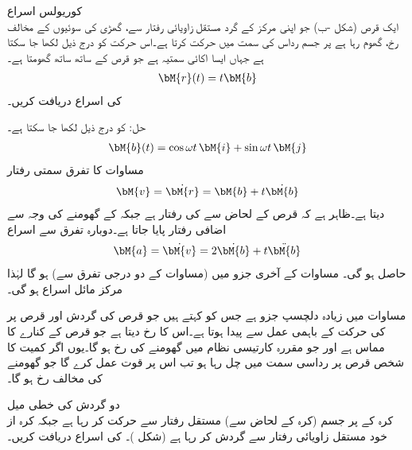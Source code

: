 \quad کوریولس اسراع\\ 
ایک قرص (شکل -ب) جو اپنی مرکز کے گرد مستقل زاویائی رفتار  سے، گھڑی کی سوئیوں کے مخالف رخ، گھوم رہا ہے پر جسم   رداس کی سمت میں حرکت کرتا ہے۔اس حرکت کو درج ذیل لکھا جا سکتا ہے جہاں  ایسا اکائی سمتیہ ہے جو قرص کے ساتھ ساتھ گھومتا ہے۔
\begin{align}\label{مساوات_الاحصاء_مثال_کوریولس_الف}
\bM{r}(t)=t\bM{b}
\end{align}
 کی اسراع دریافت کریں۔

حل: کو درج ذیل لکھا جا سکتا ہے۔
\begin{align}\label{مساوات_الاحصاء_مثال_کوریولس_ب}
\bM{b}(t)=\cos \omega t \,\bM{i}+\sin \omega t \, \bM{j}
\end{align}
مساوات  کا تفرق سمتی رفتار
\begin{align}\label{مساوات_الاحصاء_مثال_کوریولس_پ}
\bM{v}=\dot{\bM{r}}=\bM{b}+t\dot{\bM{b}}
\end{align}
دیتا ہے۔ظاہر ہے کہ قرص کے لحاض سے  کی رفتار  ہے جبکہ  کے گھومنے کی وجہ سے اضافی رفتار  پایا جاتا ہے۔دوبارہ تفرق سے اسراع 
\begin{align}\label{مساوات_الاحصاء_مثال_کوریولس_ت}
\bM{a}=\dot{\bM{v}}=2\dot{\bM{b}}+t\ddot{\bM{b}}
\end{align}
حاصل ہو گی۔ مساوات  کے آخری جزو میں (مساوات   کے دو درجی تفرق سے)   ہو گا لہٰذا  مرکز مائل اسراع ہو گی۔

 مساوات  میں زیادہ دلچسپ جزو  ہے جس کو  کہتے ہیں  جو قرص کی گردش اور قرص پر  کی حرکت  کے باہمی عمل سے پیدا ہوتا ہے۔اس کا رخ  دیتا ہے جو قرص کے کنارے کا مماس ہے اور جو  مقررہ  کارتیسی نظام میں گھومنے کی رخ ہو گا۔یوں اگر کمیت   کا شخص قرص پر رداسی سمت میں چل رہا ہو تب اس پر قوت  عمل کرے گا جو گھومنے کی مخالف رخ ہو گا۔ 

\quad دو گردش کی خطی میل\\
کرہ کے   پر جسم   (کرہ کے لحاض سے) مستقل رفتار سے حرکت کر رہا ہے جبکہ کرہ از خود مستقل زاویائی رفتار   سے گردش کر رہا ہے (شکل )۔  کی اسراع دریافت کریں۔

